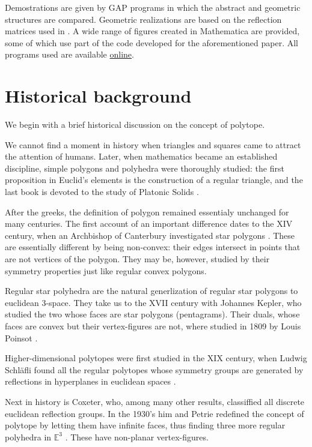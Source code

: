 \documentclass{article}
\theoremstyle{definition}
\newcommand{\E}{\mathbb{E}}
\begin{document}
	Demostrations are given by GAP programs in which the abstract and geometric structures are compared. Geometric realizations are based on the reflection matrices used in \cite{petcox}. A wide range of figures created in Mathematica are provided, some of which use part of the code developed for the aforementioned paper. All programs used are available \href{https://github.com/danimalabares/tesina.git}{online}.
	
	\section{Historical background}
	We begin with a brief historical discussion on the concept of polytope.
	
	We cannot find a moment in history when triangles and squares came to attract the attention of humans. Later, when mathematics became an established discipline, simple polygons and polyhedra were thoroughly studied: the first proposition in Euclid's elements is the construction of a regular triangle, and the last book is devoted to the study of Platonic Solids \cite{euclid}.
	
	After the greeks, the definition of polygon remained essentialy unchanged for many centuries. The first account of an important difference dates to the XIV century, when an Archbishop of Canterbury investigated star polygons \cite{abstract-polytopes}.
	These are essentially different by being non-convex: their edges intersect in points that are not vertices of the polygon. They may be, however, studied by their symmetry properties just like regular convex polygons.
	
	Regular star polyhedra are the natural generlization of regular star polygons to euclidean 3-space. They take us to the XVII century with Johannes Kepler, who studied the two whose faces are star polygons (pentagrams). Their duals, whose faces are convex but their vertex-figures are not, where studied in 1809 by Louis Poinsot \cite{abstract-polytopes}.
	
	Higher-dimensional polytopes were first studied in the XIX century, when Ludwig Schläfli found all the regular polytopes whose symmetry groups are generated by reflections in hyperplanes in euclidean spaces \cite{abstract-polytopes}.
	
	Next in history is Coxeter, who, among many other results, classiffied all discrete euclidean reflection groups. In the 1930's him and Petrie redefined the concept of polytope by letting them have infinite faces, thus finding three more regular polyhedra in $\E^3$ \cite{regular-skew}. These have non-planar vertex-figures.
	
\end{document}
